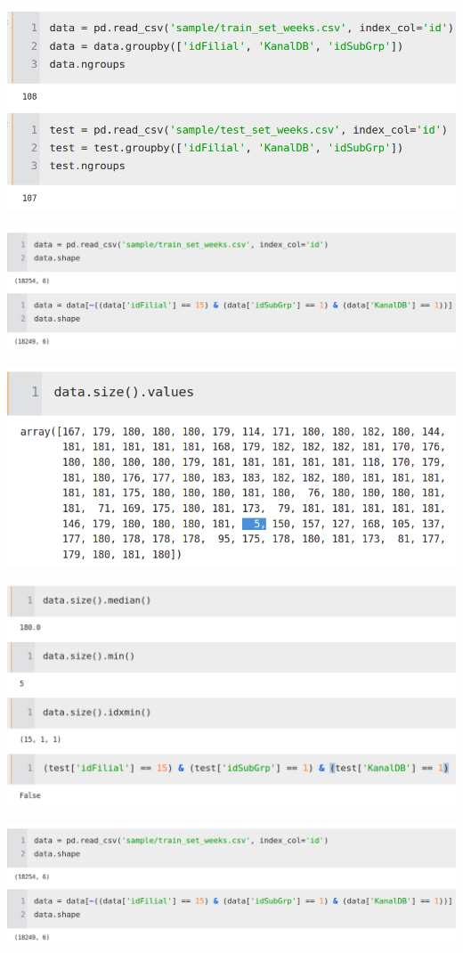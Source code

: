 \documentclass[russian, 10pt]{beamer}
\begin{document}
\begin{frame}

\includegraphics[scale=0.5]{images/3.png}

\end{frame}

\begin{frame}
\includegraphics[scale=0.5]{images/5.png}
\end{frame}

\begin{frame}
\includegraphics[scale=0.5]{images/6.png}
\end{frame}

\begin{frame}
\includegraphics[scale=0.45]{images/4.png}
\end{frame}

\begin{frame}
\includegraphics[scale=0.5]{images/5.png}
\end{frame}
\end{document}
